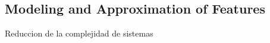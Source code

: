 \documentclass[sensors,article,submit,moreauthors,pdftex]{Definitions/mdpi}
\begin{document}
\subsection{Modeling and Approximation of Features}
Reduccion de la complejidad de sistemas






\end{document}
